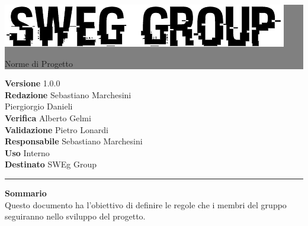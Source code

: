 \documentclass[12pt,a4paper,titlepage]{article}
\newcommand{\HRule}[1]{\hfill \rule{0.2\linewidth}{#1}} %
\begin{document}
	
	\thispagestyle{empty} %
	
	
	\colorbox{grey}{
		\parbox[t]{1.0\linewidth}{
			\centering \fontsize{50pt}{80pt}\selectfont %
			\vspace*{0.7cm} %
			
			\raggedleft
			\includegraphics[width=0.7\linewidth]{../../LogoSWEgGroupSFONDOVUOTO}
			
			\hfill Norme di Progetto \\
			
			\vspace*{0.7cm} %
		}
	}
	
	
	\vfill %
	
	
	{\centering \large 
		\hfill \textbf{Versione} 1.0.0 \\
		\hfill \textbf{Redazione} Sebastiano Marchesini \\
		\hfill Piergiorgio Danieli \\
		\hfill \textbf{Verifica} Alberto Gelmi \\
		\hfill \textbf{Validazione} Pietro Lonardi \\
		\hfill \textbf{Responsabile} Sebastiano Marchesini \\
		\hfill \textbf{Uso} Interno \\
		\hfill \textbf{Destinato} SWEg Group \\ 
		
		\HRule{1pt}
		
		\textbf{Sommario} \\
		Questo documento ha l'obiettivo di definire le regole che i membri del gruppo seguiranno nello sviluppo del progetto.
		
	} %
	
\end{document}
